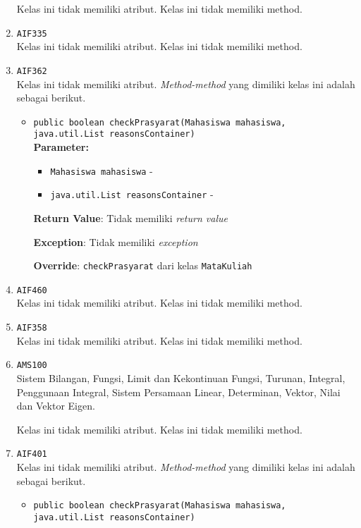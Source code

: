 \documentclass{article}
\begin{document}
\begin{enumerate}
Kelas ini tidak memiliki atribut. Kelas ini tidak memiliki method. \item \texttt{AIF335}\\ 


Kelas ini tidak memiliki atribut. Kelas ini tidak memiliki method. \item \texttt{AIF362}\\ 


Kelas ini tidak memiliki atribut. \textit{Method-method} yang dimiliki kelas ini adalah sebagai berikut.
\begin{itemize}
\item \texttt{public boolean checkPrasyarat(Mahasiswa mahasiswa, java.util.List reasonsContainer)}\\ 


\textbf{Parameter:}\begin{itemize}
\item \texttt{Mahasiswa mahasiswa} - 
\item \texttt{java.util.List reasonsContainer} - 
\end{itemize}
\textbf{Return Value}: Tidak memiliki \textit{return value}

\textbf{Exception}: Tidak memiliki \textit{exception}

\textbf{Override}: \texttt{checkPrasyarat} dari kelas \texttt{MataKuliah}

\end{itemize}
\item \texttt{AIF460}\\ 


Kelas ini tidak memiliki atribut. Kelas ini tidak memiliki method. \item \texttt{AIF358}\\ 


Kelas ini tidak memiliki atribut. Kelas ini tidak memiliki method. \item \texttt{AMS100}\\ 
Sistem Bilangan, Fungsi, Limit dan Kekontinuan Fungsi, Turunan, Integral, 
 Penggunaan Integral, Sistem Persamaan Linear, Determinan, Vektor, Nilai dan 
 Vektor Eigen.

Kelas ini tidak memiliki atribut. Kelas ini tidak memiliki method. \item \texttt{AIF401}\\ 


Kelas ini tidak memiliki atribut. \textit{Method-method} yang dimiliki kelas ini adalah sebagai berikut.
\begin{itemize}
\item \texttt{public boolean checkPrasyarat(Mahasiswa mahasiswa, java.util.List reasonsContainer)}\\ 



\end{itemize}
\end{enumerate}
\end{document}
